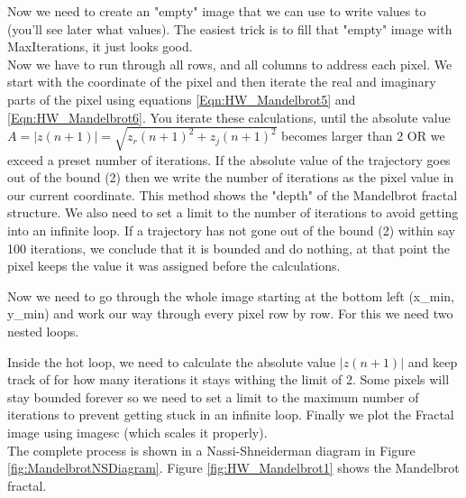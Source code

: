 \documentclass[12pt,letterpaper]{article}
\begin{document}
Now we need to create an "empty" image that we can use to write values to (you'll see later what values). The easiest trick is to fill that "empty" image with MaxIterations, it just looks good.\\

Now we have to run through all rows, and all columns to address each pixel. We start with the coordinate of the pixel and then iterate the real and imaginary parts of the pixel using equations \ref{Eqn:HW_Mandelbrot5} and \ref{Eqn:HW_Mandelbrot6}. You iterate these calculations, until the absolute value $A = \left|  z(n+1) \right| = \sqrt{z_r(n+1)^2 + z_j(n+1)^2} $ becomes larger than 2 OR we exceed a preset number of iterations. If the absolute value of the trajectory goes out of the bound (2) then we write the number of iterations as the pixel value in our current coordinate. This method shows the "depth" of the Mandelbrot fractal structure. We also need to set a limit to the number of iterations to avoid getting into an infinite loop. If a trajectory has not gone out of the bound (2) within say 100 iterations, we conclude that it is bounded and do nothing, at that point the pixel keeps the value it was assigned before the calculations. 

Now we need to go through the whole image starting at the bottom left (x\_min, y\_min) and work our way through every pixel row by row. For this we need two nested loops. 

Inside the hot loop, we need to calculate the absolute value $\left|  z(n+1) \right|$ and keep track of for how many iterations it stays withing the limit of 2. Some pixels will stay bounded forever so we need to set a limit to the maximum number of iterations to prevent getting stuck in an infinite loop. Finally we plot the Fractal image using imagesc (which scales it properly).\\

The complete process is shown in a Nassi-Shneiderman diagram in Figure \ref{fig:MandelbrotNSDiagram}. Figure \ref{fig:HW_Mandelbrot1} shows the Mandelbrot fractal. \\
\end{document}
